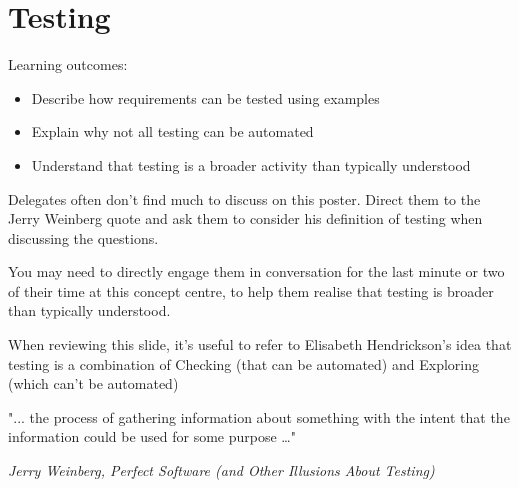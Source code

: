 \chapter*{Testing}

\ifnotes
    Learning outcomes:
    
    \begin{itemize}
        \item Describe how requirements can be tested using examples
        \item Explain why not all testing can be automated
        \item Understand that testing is a broader activity than typically understood
    \end{itemize}
        
    Delegates often don't find much to discuss on this poster. Direct them to the Jerry Weinberg quote and ask them to consider his definition of testing when discussing the questions.
    
    You may need to directly engage them in conversation for the last minute or two of their time at this concept centre, to help them realise that testing is broader than typically understood.
    
    When reviewing this slide, it's useful to refer to Elisabeth Hendrickson's idea that testing is a combination of Checking (that can be automated) and Exploring (which can't be automated)
\fi 

\ifcontent
    \begin{framed}
       "... the process of gathering information about something with the intent that the information could be used for some purpose …" 
       
       \begin{flushright}
            \textit{Jerry Weinberg, Perfect Software (and Other Illusions About Testing)}
        \end{flushright}
    \end{framed}    
    
    \vspace{0.5cm}
    
    
    
\fi